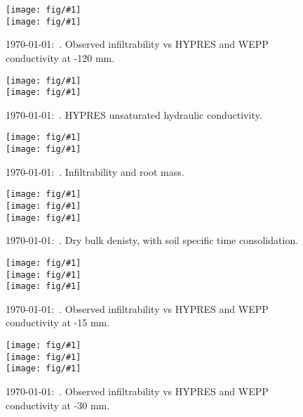 \documentclass[a4paper]{article}
\newcommand{\figright}[1]{\texttt{[image: fig/\#1]}}
\newcommand{\figctop}[1]{\hspace*{-1cm}\figright{#1}}
\newcommand{\figc}[1]{\vspace*{-1.6cm}\figctop{#1}}
\newcommand{\MyID}{\today:~}
\begin{document}
\begin{figure}[htbp]
  \begin{center}
    \figctop{K120_S8} \\
    \figc{K120_S9}
  \end{center}
  \caption{\MyID{}. Observed infiltrability vs HYPRES and WEPP conductivity at -120 mm.}
  \label{fig:K120_S}
\end{figure}

\begin{figure}[htbp]
  \begin{center}
    \figctop{KM_S8} \\
    \figc{KM_S9}
  \end{center}
  \caption{\MyID{}. HYPRES unsaturated hydraulic conductivity.}
  \label{fig:KM_S}
\end{figure}

\begin{figure}[htbp]
  \begin{center}
    \figctop{K15_S8_root} \\
    \figc{K15_S9_root}
  \end{center}
  \caption{\MyID{}. Infiltrability and root mass.}
  \label{fig:K15root_S}
\end{figure}

\clearpage{}

\begin{figure}[htbp]
  \begin{center}
    \figctop{rho_b_N1} \\
    \figc{rho_b_N2} \\
    \figc{rho_b_K3}
  \end{center}
  \caption{\MyID{}. Dry bulk denisty, with soil specific time consolidation.}
  \label{fig:rho_b_K}
\end{figure}

\begin{figure}[htbp]
  \begin{center}
    \figctop{K15_N1} \\
    \figc{K15_N2} \\
    \figc{K15_K3}
  \end{center}
  \caption{\MyID{}. Observed infiltrability vs HYPRES and WEPP conductivity at -15 mm.}
  \label{fig:K15_K}
\end{figure}

\begin{figure}[htbp]
  \begin{center}
    \figctop{K30_N1} \\
    \figc{K30_N2} \\
    \figc{K30_K3}
  \end{center}
  \caption{\MyID{}. Observed infiltrability vs HYPRES and WEPP conductivity at -30 mm.}
  \label{fig:K30_K}
\end{figure}
\end{document}
